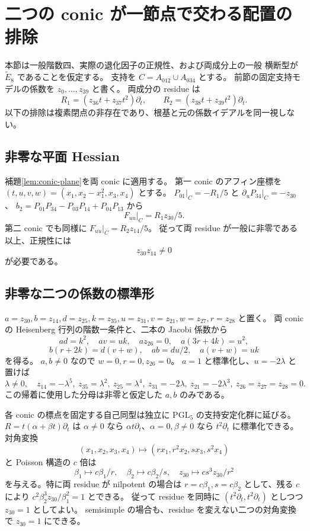 \documentclass[11pt,a4paper]{ltjsarticle}
\theoremstyle{remark}\newtheorem{remark}[theorem]{注意}
\begin{document}
\section{二つの conic が一節点で交わる配置の排除}

本節は一般階数四、実際の退化因子の正規性、および両成分上の一般
横断型が $\widetilde E_8$ であることを仮定する。
支持を $C=A_{012}\cup A_{034}$ とする。
前節の固定支持モデルの係数を $z_0,\ldots,z_{39}$ と書く。
両成分の residue は
\[
R_1=(z_{36}t+z_{37}t^2)\partial_t,\qquad
R_2=(z_{38}t+z_{39}t^2)\partial_t.
\]
以下の排除は複素閉点の非存在であり、根基と元の係数イデアルを同一視しない。

\subsection{非零な平面 Hessian}
補題\ref{lem:conic-plane}を両 conic に適用する。
第一 conic のアフィン座標を
$(t,u,v,w)=(x_1,x_2-x_1^2,x_3,x_4)$ とする。
$P_{01}|_C=-R_1/5$ と $\partial_uP_{34}|_C=-z_{30}$、
$b_2=P_{01}P_{34}-P_{03}P_{14}+P_{04}P_{13}$ から
\[
F_{uu}|_C=R_1z_{30}/5.
\]
第二 conic でも同様に $F_{uu}|_C=R_2z_{14}/5$。
従って両 residue が一般に非零である以上、正規性には
\[
z_{30}z_{14}\ne0
\]
が必要である。

\subsection{非零な二つの係数の標準形}

$a=z_{30},b=z_{14},d=z_{25},k=z_{35},u=z_{31},v=z_{21},w=z_{27},r=z_{28}$ と置く。
両 conic の Heisenberg 行列の階数一条件と、二本の Jacobi 係数から
\[
ad=k^2,\quad av=uk,\quad a z_{26}=0,\quad a(3r+4k)=u^2,
\]
\[
b(r+2k)=d(v+w),\quad ab=du/2,\quad a(v+w)=uk
\]
を得る。
$a,b\ne0$ なので $w=0,r=0,z_{26}=0$。
$a=1$ と標準化し、$u=-2\lambda$ と置けば
\[
\lambda\ne0,\quad
z_{14}=-\lambda^5,\ z_{35}=\lambda^2,\ z_{25}=\lambda^4,\
z_{31}=-2\lambda,\ z_{21}=-2\lambda^3,\ z_{26}=z_{27}=z_{28}=0.
\]
この帰着に使用した分母は非零と仮定した $a,b$ のみである。

各 conic の標点を固定する自己同型は独立に $\mathrm{PGL}_5$ の支持安定化群に延びる。
$R=t(\alpha+\beta t)\partial_t$ は $\alpha\ne0$ なら
$\alpha t\partial_t$、$\alpha=0,\beta\ne0$ なら $t^2\partial_t$ に標準化できる。
対角変換
\[
(x_1,x_2,x_3,x_4)\mapsto(rx_1,r^2x_2,sx_3,s^2x_4)
\]
と Poisson 構造の $c$ 倍は
\[
\beta_1\mapsto c\beta_1/r,\quad
\beta_2\mapsto c\beta_2/s,\quad
z_{30}\mapsto cs^3z_{30}/r^2
\]
を与える。特に両 residue が nilpotent の場合は
$r=c\beta_1,s=c\beta_2$ として、残る $c$ により
$c^2\beta_2^3z_{30}/\beta_1^2=1$ とできる。
従って residue を同時に $(t^2\partial_t,t^2\partial_t)$ としつつ $z_{30}=1$ としてよい。
semisimple の場合も、residue を変えない二つの対角変換で $z_{30}=1$ にできる。
\end{document}
